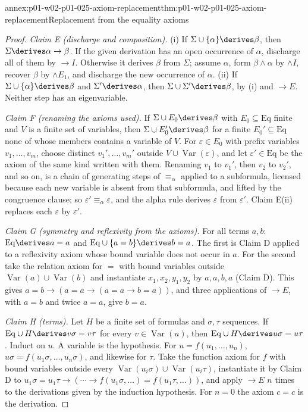 \begin{annexitem}{annex:p01-w02-p01-025-axiom-replacement}{thm:p01-w02-p01-025-axiom-replacement}{Replacement from the equality axioms}
\begin{proof}
\emph{Claim E (discharge and composition).}  (i) If
\(\Sigma\cup\{\alpha\}\derives\beta\), then
\(\Sigma\derives\alpha\to\beta\).  If the given derivation has an open
occurrence of \(\alpha\), discharge all of them by \(\to I\).  Otherwise it
derives \(\beta\) from \(\Sigma\); assume \(\alpha\), form
\(\beta\land\alpha\) by \(\land I\), recover \(\beta\) by \(\land E_1\), and
discharge the new occurrence of \(\alpha\).  (ii) If
\(\Sigma\cup\{\alpha\}\derives\beta\) and \(\Sigma'\derives\alpha\), then
\(\Sigma\cup\Sigma'\derives\beta\), by (i) and \(\to E\).  Neither step has
an eigenvariable.

\emph{Claim F (renaming the axioms used).}  If
\(\Sigma\cup E_0\derives\beta\) with \(E_0\subseteq\mathrm{Eq}\) finite and
\(V\) is a finite set of variables, then \(\Sigma\cup E_0'\derives\beta\) for
a finite \(E_0'\subseteq\mathrm{Eq}\) none of whose members contains a
variable of \(V\).  For \(\varepsilon\in E_0\) with prefix variables
\(v_1,\ldots,v_m\), choose distinct \(v_1',\ldots,v_m'\) outside
\(V\cup\operatorname{Var}(\varepsilon)\), and let \(\varepsilon'\in
\mathrm{Eq}\) be the axiom of the same kind written with them.  Renaming
\(v_1\) to \(v_1'\), then \(v_2\) to \(v_2'\), and so on, is a chain of
generating steps of \(\equiv_\alpha\) applied to a subformula, licensed
because each new variable is absent from that subformula, and lifted by the
congruence clause; so \(\varepsilon'\equiv_\alpha\varepsilon\), and the
alpha rule derives \(\varepsilon\) from \(\varepsilon'\).  Claim E(ii)
replaces each \(\varepsilon\) by \(\varepsilon'\).

\emph{Claim G (symmetry and reflexivity from the axioms).}  For all terms
\(a,b\): \(\mathrm{Eq}\derives a=a\) and
\(\mathrm{Eq}\cup\{a=b\}\derives b=a\).  The first is Claim D applied to a
reflexivity axiom whose bound variable does not occur in \(a\).  For the
second take the relation axiom for \(=\) with bound variables outside
\(\operatorname{Var}(a)\cup\operatorname{Var}(b)\) and instantiate
\(x_1,x_2,y_1,y_2\) by \(a,a,b,a\) (Claim D).  This gives
\(a=b\to(a=a\to(a=a\to b=a))\), and three applications of \(\to E\), with
\(a=b\) and twice \(a=a\), give \(b=a\).

\emph{Claim H (terms).}  Let \(H\) be a finite set of formulas and
\(\sigma,\tau\) sequences.  If \(\mathrm{Eq}\cup H\derives v\sigma=v\tau\)
for every \(v\in\operatorname{Var}(u)\), then
\(\mathrm{Eq}\cup H\derives u\sigma=u\tau\).  Induct on \(u\).  A variable is
the hypothesis.  For \(u=f(u_1,\ldots,u_n)\),
\(u\sigma=f(u_1\sigma,\ldots,u_n\sigma)\), and likewise for \(\tau\).  Take
the function axiom for \(f\) with bound variables outside every
\(\operatorname{Var}(u_i\sigma)\cup\operatorname{Var}(u_i\tau)\), instantiate
it by Claim D to
\(u_1\sigma=u_1\tau\to(\cdots\to f(u_1\sigma,\ldots)=f(u_1\tau,\ldots))\),
and apply \(\to E\) \(n\) times to the derivations given by the induction
hypothesis.  For \(n=0\) the axiom \(c=c\) is the derivation.


\end{proof}
\end{annexitem}
